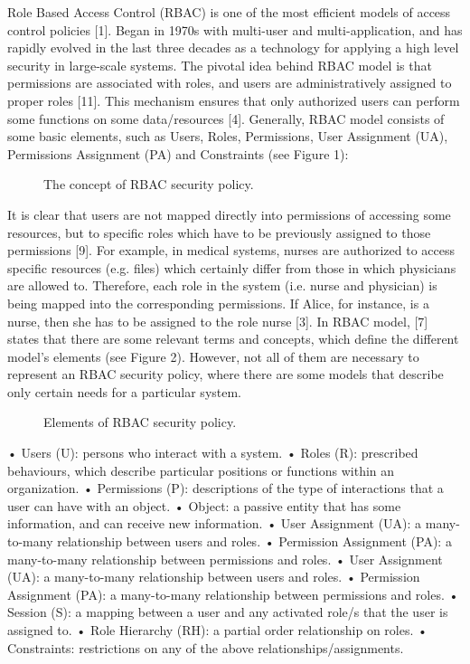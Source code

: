 Role Based Access Control (RBAC) is one of the most efficient models of access control policies [1].  Began in 1970s with multi-user and multi-application, and has rapidly evolved in the last three decades as a technology for applying a high level security in large-scale systems.  The pivotal idea behind RBAC model is that permissions are associated with roles, and users are administratively assigned to proper roles [11]. This mechanism ensures that only authorized users can perform some functions on some data/resources [4]. Generally, RBAC model consists of some basic elements, such as Users, Roles, Permissions, User Assignment (UA), Permissions Assignment (PA) and Constraints (see Figure 1):

\begin{figure}[bht]
\centering
\caption{The concept of RBAC security policy.}
\label{fig:RBACPol}
\end{figure}


It is clear that users are not mapped directly into permissions of accessing some resources, but to specific roles which have to be previously assigned to those permissions [9].  For example, in medical systems, nurses are authorized to access specific resources (e.g. files) which certainly differ from those in which physicians are allowed to.  Therefore, each role in the system (i.e. nurse and physician) is being mapped into the corresponding permissions.  If Alice, for instance, is a nurse, then she has to be assigned to the role nurse [3]. 
      In RBAC model, [7] states that there are some relevant terms and concepts, which define the different model’s elements (see Figure 2).  However, not all of them are necessary to represent an RBAC security policy, where there are some models that describe only certain needs for a particular system.

\begin{figure}[bht]
\centering
\caption{Elements of RBAC security policy.}
\label{fig:elelmRBAC}
\end{figure}

•	Users (U): persons who interact with a system.
•	Roles (R): prescribed behaviours, which describe particular positions or functions within an organization. 
•	Permissions (P):  descriptions of the type of interactions that a user can have with an object.
•	Object: a passive entity that has some information, and   can receive new information.
•	User Assignment (UA): a many-to-many relationship   between users and roles.
•	Permission Assignment (PA): a many-to-many relationship between permissions and roles.
•	User Assignment (UA): a many-to-many relationship between users and roles.
•	 Permission Assignment (PA): a many-to-many relationship between permissions and roles.
•	Session (S): a mapping between a user and any activated role/s that the user is assigned to.
•	Role Hierarchy (RH): a partial order relationship on roles.
•	Constraints: restrictions on any of the above relationships/assignments.  


